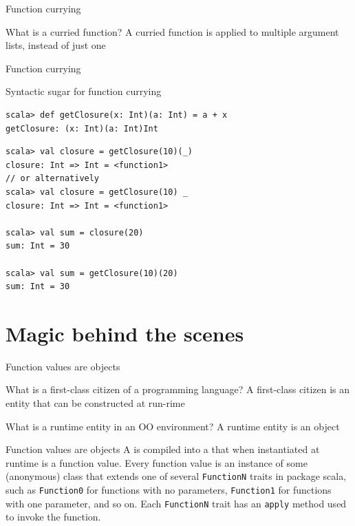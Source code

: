 \begin{frame}{Function currying}
\begin{block}{What is a curried function?}
A curried function is applied to multiple argument lists, instead of just one
\end{block}
\end{frame}

\begin{frame}[fragile]{Function currying}
\begin{exampleblock}{Syntactic sugar for function currying}
\begin{lstlisting}
scala> def getClosure(x: Int)(a: Int) = a + x
getClosure: (x: Int)(a: Int)Int
\end{lstlisting}
\pause
\begin{lstlisting}
scala> val closure = getClosure(10)(_)
closure: Int => Int = <function1>
// or alternatively
scala> val closure = getClosure(10) _
closure: Int => Int = <function1>

scala> val sum = closure(20)
sum: Int = 30

scala> val sum = getClosure(10)(20)
sum: Int = 30
\end{lstlisting}
\end{exampleblock}
\end{frame}

\section{Magic behind the scenes}
\begin{frame}{Function values are objects}
\begin{block}{What is a first-class citizen of a programming language?}
\pause
A first-class citizen is an entity that can be constructed at run-rime
\end{block}
\pause
\begin{block}{What is a runtime entity in an OO environment?}
\pause
A runtime entity is an object
\end{block}
\pause
\begin{center}
\end{center}
\end{frame}

\begin{frame}{Function values are objects}
A  is compiled into a  that when
instantiated at runtime is a function value. Every function value is an instance
of some (anonymous) class that extends one of several \lstinline!FunctionN!
traits in package scala, such as \lstinline!Function0! for functions with no
parameters, \lstinline!Function1! for functions with one parameter, and so on.
Each \lstinline!FunctionN! trait has an \lstinline!apply! method used to invoke
the function.
\end{frame}

